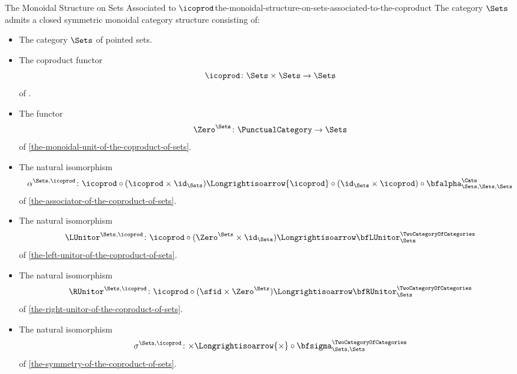 \begin{proposition}{The Monoidal Structure on Sets Associated to $\icoprod$}{the-monoidal-structure-on-sets-associated-to-the-coproduct}%
    The category $\Sets$ admits a closed symmetric monoidal category structure consisting of:%
    \begin{itemize}
        \item{}The category $\Sets$ of pointed sets.
        \item{}The coproduct functor
            \[
                \icoprod%
                \colon%
                \Sets\times\Sets%
                \to%
                \Sets
            \]%
            of .
        \item{}The functor
            \[
                \Zero^{\Sets}
                \colon
                \PunctualCategory
                \to
                \Sets
            \]%
            of \cref{the-monoidal-unit-of-the-coproduct-of-sets}.
        \item{}The natural isomorphism
            \[
                \alpha^{\Sets,\icoprod}
                \colon
                {\icoprod}\circ{({\icoprod}\times\id_{\Sets})}
                \Longrightisoarrow
                {\icoprod}\circ{(\id_{\Sets}\times{\icoprod})}\circ{\bfalpha^{\Cats}_{\Sets,\Sets,\Sets}}
            \]%
            of \cref{the-associator-of-the-coproduct-of-sets}.
        \item{}The natural isomorphism
            \[
                \LUnitor^{\Sets,\icoprod}%
                \colon%
                {\icoprod}\circ{(\Zero^{\Sets}\times\id_{\Sets})}
                \Longrightisoarrow
                \bfLUnitor^{\TwoCategoryOfCategories}_{\Sets}
            \]%
            of \cref{the-left-unitor-of-the-coproduct-of-sets}.
        \item{}The natural isomorphism
            \[
                \RUnitor^{\Sets,\icoprod}%
                \colon%
                {\icoprod}\circ{({\sfid}\times{\Zero^{\Sets}})}%
                \Longrightisoarrow%
                \bfRUnitor^{\TwoCategoryOfCategories}_{\Sets}%
            \]%
            of \cref{the-right-unitor-of-the-coproduct-of-sets}.
        \item{}The natural isomorphism
            \[
                \sigma^{\Sets,\icoprod}
                \colon
                {\times}
                \Longrightisoarrow
                {\times}\circ{\bfsigma^{\TwoCategoryOfCategories}_{\Sets,\Sets}}
            \]%
            of \cref{the-symmetry-of-the-coproduct-of-sets}.
    \end{itemize}
\end{proposition}
